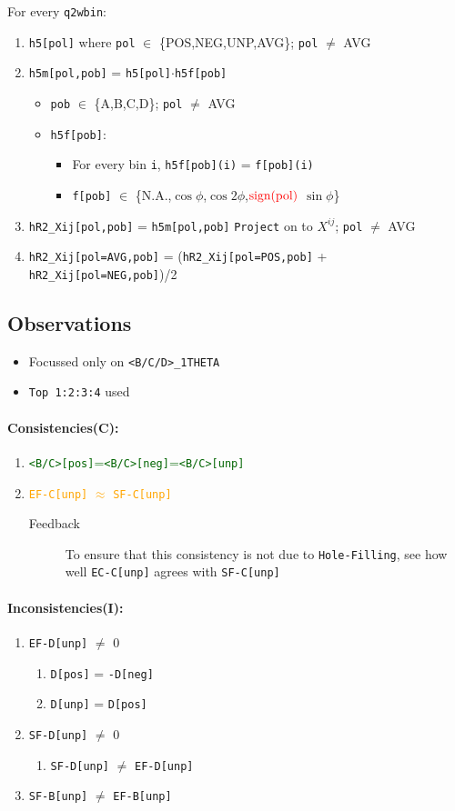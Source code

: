 \documentclass{article}
\newcommand{\code}[1]{\texttt{#1}}
\newcommand{\bi}{\begin{itemize}}
\newcommand{\ei}{\end{itemize}}
\newcommand{\be}{\begin{enumerate}}
\newcommand{\ee}{\end{enumerate}}
\newcommand{\atgr}[1]{\textcolor{darkgreen}{#1}}
\newcommand{\ator}[1]{\textcolor{orange}{#1}}
\numberwithin{equation}{subsection}
\begin{document}
For every \code{q2wbin}:
\begin{enumerate}
	\item \code{h5[pol]} where \code{pol} $\in$ \{POS,NEG,UNP,AVG\}; \code{pol} $\neq$ AVG
	\item \code{h5m[pol,pob]} = \code{h5[pol]}$\cdot$\code{h5f[pob]} 
		\begin{itemize}
		\item \code{pob} $\in$ \{A,B,C,D\}; \code{pol} $\neq$ AVG
		\item \code{h5f[pob]}:
			\begin{itemize}
			\item For every bin \code{i}, \code{h5f[pob](i)} = \code{f[pob](i)}
			\item \code{f[pob]} $\in$ \{N.A.,$\cos\phi$,$\cos 2\phi$,$\color{red}{\text{sign(pol)}}$ $\sin\phi$\}
			\end{itemize}
		\end{itemize}
	\item \code{hR2\_Xij[pol,pob]} = \code{h5m[pol,pob]} \code{Project} on to $X^{ij}$; \code{pol} $\neq$ AVG
	\item \code{hR2\_Xij[pol=AVG,pob]} = (\code{hR2\_Xij[pol=POS,pob]} + \code{hR2\_Xij[pol=NEG,pob]})/2
\end{enumerate}

\subsection{Observations}
\bi
	\item Focussed only on \code{<B/C/D>\_1THETA}
	\item \code{Top 1:2:3:4} used
\ei

\paragraph{\textbf{Consistencies(C)}:}
\be
	\item \atgr{\code{<B/C>[pos]}=\code{<B/C>[neg]}=\code{<B/C>[unp]}}
	\item \ator{\code{EF-C[unp]} $\approx$ \code{SF-C[unp]}}
		\begin{description}
			\item [Feedback] To ensure that this consistency is not due to \code{Hole-Filling}, see how well \code{EC-C[unp]} agrees with \code{SF-C[unp]}
		\end{description}
\ee

\paragraph{\textbf{Inconsistencies(I)}:}
\be
   	\item \code{EF-D[unp]} $\neq$ 0
   	\be
   		\item \code{D[pos]} = \code{-D[neg]}
   		\item \code{D[unp]} = \code{D[pos]}
   	\ee
   	\item \code{SF-D[unp]} $\neq$ 0
   	\be
   		\item \code{SF-D[unp]} $\neq$ \code{EF-D[unp]}
   	\ee
   	\item \code{SF-B[unp]} $\neq$ \code{EF-B[unp]}
\ee
\end{document}
